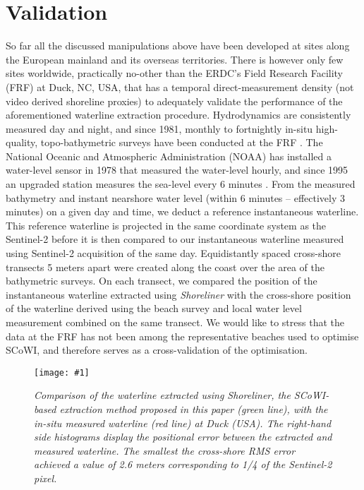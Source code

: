 \documentclass[remotesensing,technicalnote,submit,pdftex,moreauthors]{Definitions/mdpi}
\newcommand{\myfigure}[4]{
    \begin{figure*}[ht!]
        \centering
        \texttt{[image: \#1]}	 
        \caption{\itshape#2}
        \label{#3}
    \end{figure*} 
}
\begin{document}
\section{Validation}
So far all the discussed manipulations above have been developed at sites along the European mainland and its overseas territories. There is however only few sites worldwide, practically no-other than the ERDC's Field Research Facility (FRF) at Duck, NC, USA, that has a temporal direct-measurement density (not video derived shoreline proxies) to adequately validate the performance of the aforementioned waterline extraction procedure. Hydrodynamics are consistently measured day and night, and since 1981, monthly to fortnightly in-situ high-quality, topo-bathymetric surveys have been conducted at the FRF \citep{FORTE2017}. The National Oceanic and Atmospheric Administration (NOAA) has installed a water-level sensor in 1978 that measured the water-level hourly, and since 1995 an upgraded station measures the sea-level every 6 minutes \citep{park2014water}. From the measured bathymetry and instant nearshore water level (within 6 minutes -- effectively 3 minutes) on a given day and time, we deduct a reference instantaneous waterline. This reference waterline is projected in the same coordinate system as the Sentinel-2 before it is then compared to our instantaneous waterline measured using Sentinel-2 acquisition of the same day. 
Equidistantly spaced cross-shore transects 5 meters apart were created along the coast over the area of the bathymetric surveys. On each transect, we compared the position of the instantaneous waterline extracted using \textit{Shoreliner} with the cross-shore position of the waterline derived using the beach survey and local water level measurement combined on the same transect. We would like to stress that the data at the FRF has not been among the representative beaches used to optimise SCoWI, and therefore serves as a cross-validation of the optimisation.

\myfigure{img/Results.png}{Comparison of the waterline extracted using \textit{Shoreliner}, the SCoWI-based extraction method proposed in this paper (green line), with the in-situ measured waterline (red line) at Duck (USA). The right-hand side histograms display the positional error between the extracted and measured waterline. The smallest the cross-shore RMS error achieved a value of 2.6 meters corresponding to 1/4 of the Sentinel-2 pixel.}{validation}{1}
\end{document}
